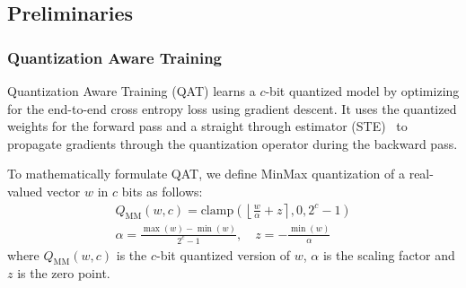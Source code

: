 


\vspace*{-2mm}
\subsection{Preliminaries}
\subsubsection{Quantization Aware Training}
Quantization Aware Training (QAT) learns a $c$-bit quantized model by optimizing for the end-to-end cross entropy loss using gradient descent. It uses the quantized weights for the forward pass and a straight through estimator (STE)~\citep{bengio2013estimating} to propagate gradients through the quantization operator during the backward pass.

To mathematically formulate QAT, we define MinMax quantization of a real-valued vector $w$ in $c$ bits as follows:
\begin{equation}
\label{eqn:minmax}
\begin{aligned}
Q_{\text{MM}}(w, c) = \text{clamp}\left(\left\lfloor \frac{w}{\alpha} + z\right\rceil, 0, 2^c-1\right) \\
    \alpha = \frac{\max(w) -\min(w)}{2^c-1}, \quad
    z = -\frac{\min(w)}{\alpha}
\end{aligned}
\end{equation}
where $Q_{\text{MM}}(w, c)$ is the $c$-bit quantized version of $w$, $\alpha$ is the scaling factor and $z$ is the zero point.


